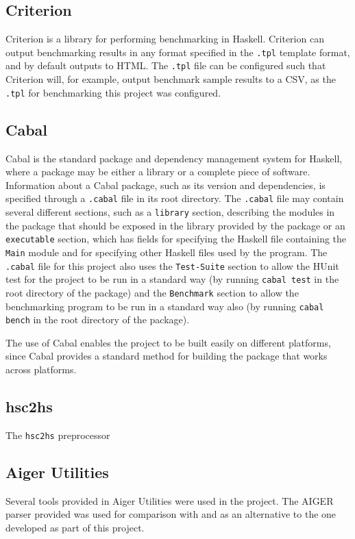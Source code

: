 \documentclass[12pt,a4paper,twoside,openright]{report}
\begin{document}
\subsection{Criterion}

Criterion is a library for performing benchmarking in Haskell.
Criterion can output benchmarking results in any format specified in the \verb,.tpl,
template format, and by default outputs to HTML.
The \verb,.tpl, file can be configured such that
Criterion will, for example, output benchmark sample results to a CSV, as the
\verb,.tpl, for benchmarking this project was configured.

\subsection{Cabal}

Cabal is the standard package and dependency management system for Haskell,
where a package may be either a library or a complete piece of software.
Information about a Cabal package, such as its version and dependencies,
is specified through a \verb,.cabal, file in its root directory.
The \verb,.cabal, file may contain several different sections, such as a
\verb,library, section, describing the modules in the package that should be
exposed in the library provided by the package or an \verb,executable, section,
which has fields for specifying the Haskell file containing the \verb,Main,
module and for specifying other Haskell files used by the program.
The \verb,.cabal, file for this project also uses the \verb,Test-Suite, section
to allow the HUnit test for the project to be run in a standard way (by running
\verb,cabal test, in the root directory of the package) and the \verb,Benchmark,
section to allow the benchmarking program to be run in a standard way also
(by running \verb,cabal bench, in the root directory of the package).


The use of Cabal enables the project to be built easily on different platforms,
since Cabal provides a standard method for building the package that works
across platforms.



\subsection{hsc2hs}

The \verb,hsc2hs, preprocessor 

\subsection{Aiger Utilities}
Several tools provided in Aiger Utilities were used in the project. The
AIGER parser provided was used for comparison with and as an alternative
to the one developed as part of this project. 
\end{document}
